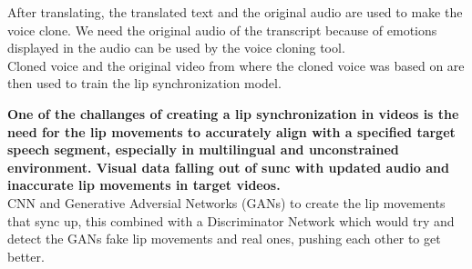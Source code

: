 \documentclass[12pt]{article}
\begin{document}
After translating, the translated text and the original audio are used to make the voice clone. We need the original audio of the transcript because of emotions displayed in the audio can be used by the voice cloning tool.\\
Cloned voice and the original video from where the cloned voice was based on are then used to train the lip synchronization model. 

\textbf{One of the challanges of creating a lip synchronization in videos is the need for the lip movements to accurately align with a specified target speech segment, especially in multilingual and unconstrained environment. Visual data falling out of sunc with updated audio and inaccurate lip movements in target videos.}\\
CNN and Generative Adversial Networks (GANs) to create the lip movements that sync up, this combined with a Discriminator Network which would try and detect the GANs fake lip movements and real ones, pushing each other to get better.
\end{document}
